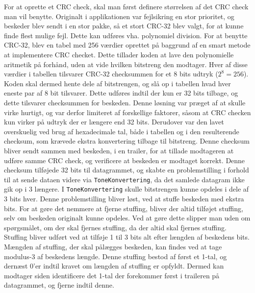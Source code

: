 For at oprette et CRC check, skal man først definere størrelsen af det CRC check man vil benytte. Originalt i applikationen var fejlsikring en stor prioritet, og beskeder blev sendt i en stor pakke, så et stort CRC-32 blev valgt, for at kunne finde flest mulige fejl. Dette kan udføres vha. polynomiel division.
\newline
For at benytte CRC-32, blev en tabel med 256 værdier oprettet på baggrund af en smart metode at implementere CRC checket. Dette tillader koden at lave den polynomielle aritmetik på forhånd, uden at vide hvilken bitstreng den modtager. Hver af disse værdier i tabellen tilsvarer CRC-32 checksummen for et 8 bits udtryk ($2^8 = 256$). Koden skal dermed hente dele af bitstrengen, og slå op i tabellen hvad hver eneste par af 8 bit tilsvarer. Dette udføres indtil der kun er 32 bits tilbage, og dette tilsvarer checksummen for beskeden.
Denne løsning var præget af at skulle virke hurtigt, og var derfor limiteret af forskellige faktorer, såsom at CRC checken kun virker på udtryk der er længere end 32 bits. Derudover var den lavet overskuelig ved brug af hexadecimale tal, både i tabellen og i den resulterende checksum, som krævede ekstra konvertering tilbage til bitstreng.
\newline
Denne checksum bliver sendt sammen med beskeden, i en trailer, for at tillade modtageren at udføre samme CRC check, og verificere at beskeden er modtaget korrekt.
\newline
Denne checksum tilføjede 32 bits til datagrammet, og skabte en problemstilling i forhold til at sende dataen videre via \texttt{ToneKonvertering}, da det samlede datagram ikke gik op i 3 længere.
\newline
I \texttt{ToneKonvertering} skulle bitstrengen kunne opdeles i dele af 3 bits hver. Denne problemstilling bliver løst, ved at stuffe beskeden med ekstra bits. For at gøre det nemmere at fjerne stuffing, bliver der altid tilføjet stuffing, selv om beskeden originalt kunne opdeles. Ved at gøre dette slipper man uden om spørgsmålet, om der skal fjernes stuffing, da der altid skal fjernes stuffing. Stuffing bliver udført ved at tilføje 1 til 3 bits alt efter længden af beskedens bits. Mængden af stuffing, der skal pålægges beskeden, kan findes ved at tage modulus-3 af beskedens længde. Denne stuffing bestod af først et 1-tal, og dernæst 0’er indtil kravet om længden af stuffing er opfyldt. Dermed kan modtager siden identificere det 1-tal der forekommer først i traileren på datagrammet, og fjerne indtil denne.
\newline
